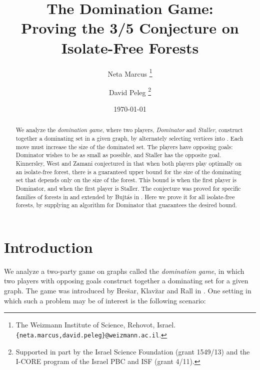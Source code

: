 \documentclass[11pt]{article}
\theoremstyle{definition}
\begin{document}
\onehalfspacing

\title{The Domination Game: \\
Proving the 3/5 Conjecture on Isolate-Free Forests}
\date{\today}
\author{Neta Marcus
\thanks{The Weizmann Institute of Science, Rehovot, Israel.
{\tt \{neta.marcus,david.peleg\}@weizmann.ac.il}.}
\and
David Peleg  
\thanks{Supported in part by the Israel Science Foundation (grant 1549/13)
and the I-CORE program of the Israel PBC and ISF (grant 4/11).}
}
\maketitle

\begin{abstract}
We analyze the \emph{domination game}, where two players, {\em Dominator} and {\em Staller}, construct together a dominating set  in a given graph, by alternately selecting vertices into . Each move must increase the size of the dominated set. The players have opposing goals: Dominator wishes  to be as small as possible, and Staller has the opposite goal. 
Kinnersley, West and Zamani conjectured in \cite{kinnersley2013extremal} that when both players play optimally on an isolate-free forest, there is a guaranteed upper bound for the size of the dominating set that depends only on the size  of the forest. This bound is  when the first player is Dominator, and  when the first player is Staller. 
The conjecture was proved for specific families of forests in \cite{kinnersley2013extremal} and extended by Bujt\'as in \cite{bujtas2015domination}. 
Here we prove it for all isolate-free forests, by supplying an algorithm for Dominator that guarantees the desired bound.
\end{abstract}


\section{Introduction}
\label{chapter:intro}

We analyze a two-party game on graphs called the \emph{domination game}, in which two players with opposing goals construct together a dominating set for a given graph.
The game was introduced by Bre\u{s}ar, Klav\u{z}ar and Rall in \cite{brevsar2010domination}.
One setting in which such a problem may be of interest is the following scenario:
\end{document}
